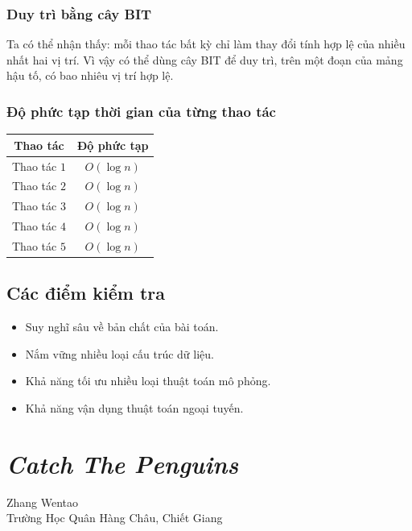 \documentclass[11pt]{article}
\begin{document}
\subsubsection{Duy trì bằng cây BIT}

Ta có thể nhận thấy: mỗi thao tác bất kỳ chỉ làm thay đổi tính hợp lệ của
nhiều nhất hai vị trí. Vì vậy có thể dùng cây BIT để duy trì, trên một đoạn
của mảng hậu tố, có bao nhiêu vị trí hợp lệ.

\subsubsection{Độ phức tạp thời gian của từng thao tác}

\begin{center}
\begin{tabular}{c c}
\textbf{Thao tác} & \textbf{Độ phức tạp} \\
\hline
Thao tác \(1\) & \(O(\log n)\) \\
Thao tác \(2\) & \(O(\log n)\) \\
Thao tác \(3\) & \(O(\log n)\) \\
Thao tác \(4\) & \(O(\log n)\) \\
Thao tác \(5\) & \(O(\log n)\)
\end{tabular}
\end{center}

\subsection{Các điểm kiểm tra}

\begin{itemize}
  \item Suy nghĩ sâu về bản chất của bài toán.
  \item Nắm vững nhiều loại cấu trúc dữ liệu.
  \item Khả năng tối ưu nhiều loại thuật toán mô phỏng.
  \item Khả năng vận dụng thuật toán ngoại tuyến.
\end{itemize}

\section{\emph{Catch The Penguins}}

\begin{center}
Zhang Wentao\\
Trường Học Quân Hàng Châu, Chiết Giang
\end{center}
\end{document}
